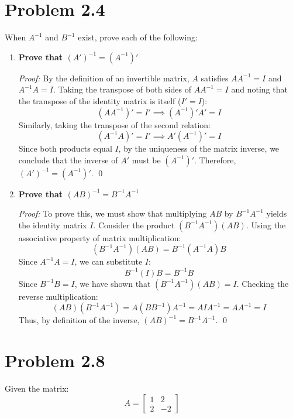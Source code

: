 \documentclass[11pt,letterpaper]{article}
\begin{document}
\section*{Problem 2.4}
When $A^{-1}$ and $B^{-1}$ exist, prove each of the following:

\begin{enumerate}
    \item[(a)] \textbf{Prove that $(A')^{-1} = (A^{-1})'$}
    
    \textit{Proof:} By the definition of an invertible matrix, $A$ satisfies $AA^{-1} = I$ and $A^{-1}A = I$. 
    Taking the transpose of both sides of $AA^{-1} = I$ and noting that the transpose of the identity matrix is itself ($I' = I$):
    $$(AA^{-1})' = I' \implies (A^{-1})'A' = I$$
    Similarly, taking the transpose of the second relation:
    $$(A^{-1}A)' = I' \implies A'(A^{-1})' = I$$
    Since both products equal $I$, by the uniqueness of the matrix inverse, we conclude that the inverse of $A'$ must be $(A^{-1})'$. Therefore, $(A')^{-1} = (A^{-1})'$. \qed

    \item[(b)] \textbf{Prove that $(AB)^{-1} = B^{-1}A^{-1}$}
    
    \textit{Proof:} To prove this, we must show that multiplying $AB$ by $B^{-1}A^{-1}$ yields the identity matrix $I$. Consider the product $(B^{-1}A^{-1})(AB)$. Using the associative property of matrix multiplication:
    $$(B^{-1}A^{-1})(AB) = B^{-1}(A^{-1}A)B$$
    Since $A^{-1}A = I$, we can substitute $I$:
    $$B^{-1}(I)B = B^{-1}B$$
    Since $B^{-1}B = I$, we have shown that $(B^{-1}A^{-1})(AB) = I$. 
    Checking the reverse multiplication:
    $$(AB)(B^{-1}A^{-1}) = A(BB^{-1})A^{-1} = AIA^{-1} = AA^{-1} = I$$
    Thus, by definition of the inverse, $(AB)^{-1} = B^{-1}A^{-1}$. \qed
\end{enumerate}

\section*{Problem 2.8}
Given the matrix:
$$A = \begin{bmatrix} 1 & 2 \\ 2 & -2 \end{bmatrix}$$
\end{document}
